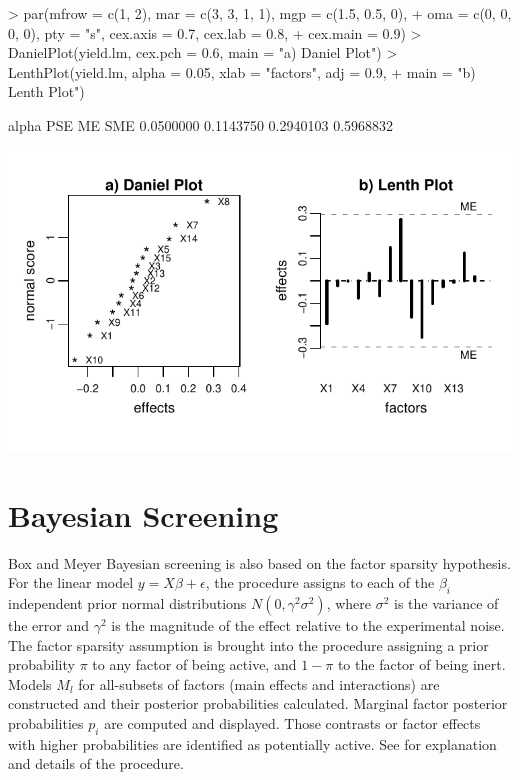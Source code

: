 \documentclass[letterpaper]{article}
\begin{document}
\begin{center}
\begin{Schunk}
\begin{Sinput}
> par(mfrow = c(1, 2), mar = c(3, 3, 1, 1), mgp = c(1.5, 0.5, 0), 
+     oma = c(0, 0, 0, 0), pty = "s", cex.axis = 0.7, cex.lab = 0.8, 
+     cex.main = 0.9)
> DanielPlot(yield.lm, cex.pch = 0.6, main = "a) Daniel Plot")
> LenthPlot(yield.lm, alpha = 0.05, xlab = "factors", adj = 0.9, 
+     main = "b) Lenth Plot")
\end{Sinput}
\begin{Soutput}
    alpha       PSE        ME       SME 
0.0500000 0.1143750 0.2940103 0.5968832 
\end{Soutput}
\end{Schunk}
\includegraphics{BsMD-006}
\end{center}

\section{Bayesian Screening}

Box and Meyer Bayesian screening is also based on the factor sparsity
hypothesis. For the linear model $y=X\beta+\epsilon$, the procedure assigns
to each of the $\beta_i$ independent prior normal distributions
$N(0,\gamma^2\sigma^2)$, where $\sigma^2$ is the variance of the error and
$\gamma^2$ is the magnitude of the effect relative to the experimental noise.
The factor sparsity assumption is brought into the procedure assigning a
prior probability $\pi$ to any factor of being active, and $1-\pi$ to the
factor of being inert. Models $M_l$ for all-subsets of factors (main effects
and interactions) are constructed and their posterior probabilities
calculated. Marginal factor posterior probabilities $p_i$ are computed and
displayed. Those contrasts or factor effects with higher probabilities are
identified as potentially active. See \citet{Box&Meyer-1986,Box&Meyer-1993}
for explanation and details of the procedure.
\end{document}
